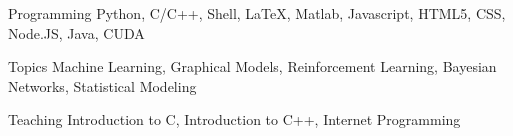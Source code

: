 


\begin{cvskills}


\cvskill
{Programming} %
{Python, C/C++, Shell, LaTeX, Matlab, Javascript, HTML5, CSS, Node.JS, Java, CUDA} %


\cvskill
{Topics} %
{Machine Learning, Graphical Models, Reinforcement Learning, Bayesian Networks, Statistical Modeling} %


\cvskill
{Teaching} %
{Introduction to C, Introduction to C++, Internet Programming} %


\end{cvskills}